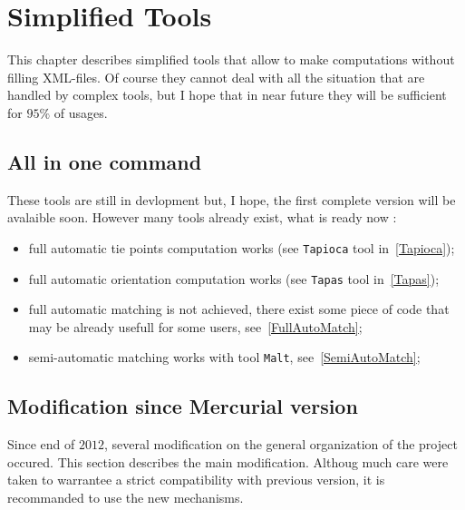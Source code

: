 \chapter{Simplified Tools}

\label{Simp:Tool:One}


This chapter describes simplified tools that allow to make
computations without filling XML-files.
Of course they cannot deal with all the situation that are
handled by complex tools, but I hope that in near future they
will be sufficient for $95\%$ of usages.


\section{All in one command}


These tools are still in devlopment but, I hope, the first complete version
will be avalaible soon. However many tools already exist, what is ready now :



\begin{itemize}
    \item full automatic tie points computation works (see {\tt Tapioca} tool in~\ref{Tapioca});
    \item full automatic orientation computation works (see {\tt Tapas} tool in~\ref{Tapas});
    \item full automatic matching is not achieved,  there exist some piece  of 
          code that may be already usefull for some users, see~\ref{FullAutoMatch};
    \item semi-automatic matching works with tool {\tt Malt}, see~\ref{SemiAutoMatch};
\end{itemize}



\section{Modification since Mercurial version}

\label{MERCURIAL}

Since end of $2012$, several modification on the general organization of the project occured.
This section describes the main modification. Althoug much care were taken to warrantee a strict 
compatibility with previous version, it is recommanded to use the new mechanisms.


